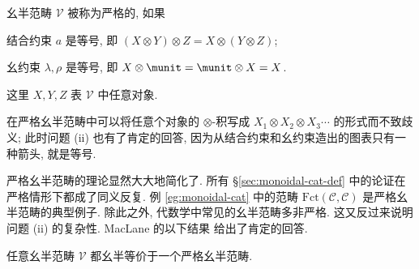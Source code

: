 \begin{definition}\label{def:strict-monoidal-cat}
	幺半范畴 $\mathcal{V}$ 被称为严格的, 如果
	\begin{compactitem}
		\item 结合约束 $a$ 是等号, 即 $(X \otimes Y) \otimes Z = X \otimes (Y \otimes Z)$;
		\item 幺约束 $\lambda, \rho$ 是等号, 即 $X \otimes \munit = \munit \otimes X = X$.
	\end{compactitem}
	这里 $X,Y,Z$ 表 $\mathcal{V}$ 中任意对象.
\end{definition}
在严格幺半范畴中可以将任意个对象的 $\otimes$-积写成 $X_1 \otimes X_2 \otimes X_3 \cdots$ 的形式而不致歧义; 此时问题 (ii) 也有了肯定的回答, 因为从结合约束和幺约束造出的图表只有一种箭头, 就是等号.

严格幺半范畴的理论显然大大地简化了. 所有 \S\ref{sec:monoidal-cat-def} 中的论证在严格情形下都成了同义反复. 例 \ref{eg:monoidal-cat} 中的范畴 $\text{Fct}(\mathcal{C}, \mathcal{C})$ 是严格幺半范畴的典型例子. 除此之外, 代数学中常见的幺半范畴多非严格. 这又反过来说明问题 (ii) 的复杂性. MacLane 的以下结果 \cite[VII.2]{ML98} 给出了肯定的回答.

\begin{theorem}[S.\ MacLane]\label{prop:ML-coherence}
	任意幺半范畴 $\mathcal{V}$ 都幺半等价于一个严格幺半范畴.
\end{theorem}

